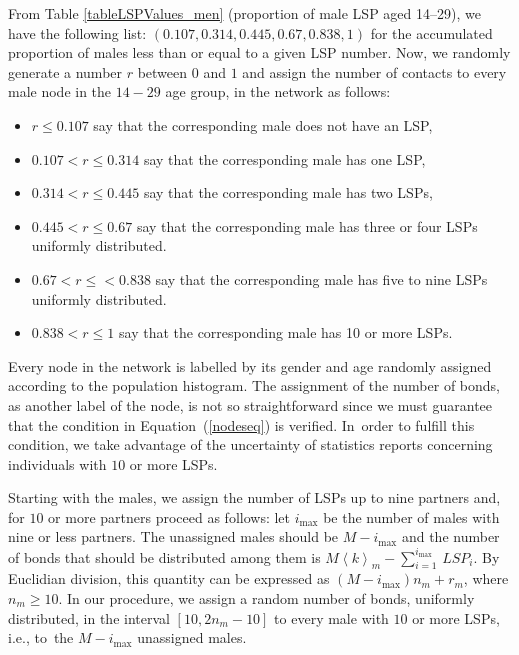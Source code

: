 From Table \ref{tableLSPValues_men} (proportion of male LSP aged 14--29), we have the following list:
$( 0.107, 0.314, 0.445, 0.67, 0.838, 1)$ for the accumulated proportion of males less than or equal to a given LSP number.
Now, we randomly generate a number $r$ between $0$ and $1$ and assign the number of contacts to every male node in the $14-29$
age group, in the network as follows:

\begin{itemize}[leftmargin=*,labelsep=5mm]
\item $r \le 0.107$ say that the corresponding male does not have an LSP,
\item $0.107 < r \le 0.314$ say that the corresponding male has one LSP,
\item $0.314 < r \le 0.445$ say that the corresponding male has two LSPs,
\item $0.445 < r \le 0.67$  say that the corresponding male has three or four LSPs uniformly distributed.
\item $0.67 < r \le < 0.838$ say that the corresponding male has five to nine LSPs uniformly distributed.
\item $0.838 < r \le 1$ say that the corresponding male has 10 or more LSPs.
\end{itemize}

Every node in the network is labelled by its gender and age randomly assigned according to the population histogram. The assignment of the number of bonds, as another label of the node, is not so straightforward since we must guarantee that the condition in Equation\ (\ref{nodeseq}) is verified. In~order to fulfill this condition, we take advantage of the uncertainty of statistics reports concerning individuals with $10$ or more LSPs.

Starting with the males, we assign the number of LSPs up to nine partners and, for $10$ or more partners proceed as follows: let $i_{\mbox{max}}$ be the number of males with nine or less partners. The unassigned males should be $M-i_{\mbox{max}}$ and the number of bonds that should be distributed among them is $M \left\langle k \right\rangle_m-\sum_{i=1}^{i_{\mbox{max}}}\, LSP_i$. By Euclidian division, this quantity can be expressed as $(M-i_{\mbox{max}}) n_m+r_m$, where $n_m \ge 10$. In our procedure, we assign a random number of bonds, uniformly distributed, in the interval $\left[10,2 n_m-10\right]$ to every male with $10$ or more LSPs, i.e.,
to~the $M-i_{\mbox{max}}$ unassigned males.

